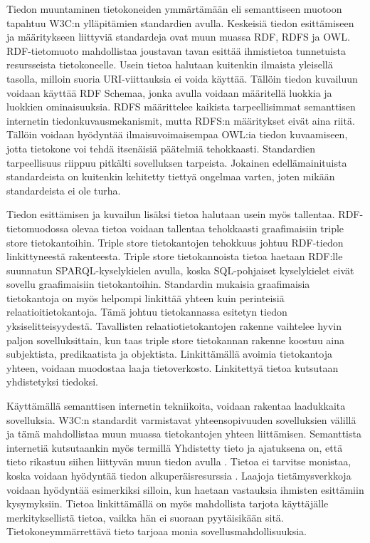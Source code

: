 \documentclass[finnish, 12pt, a4paper, elec, utf8, pdfa, online]{aaltothesis}
\begin{document}
{Tiedon muuntaminen tietokoneiden ymmärtämään eli semanttiseen muotoon tapahtuu W3C:n ylläpitämien standardien avulla. Keskeisiä tiedon esittämiseen ja määritykseen liittyviä standardeja ovat muun muassa RDF, RDFS ja OWL. RDF-tietomuoto mahdollistaa joustavan tavan esittää ihmistietoa tunnetuista resursseista tietokoneelle. Usein tietoa halutaan kuitenkin ilmaista yleisellä tasolla, milloin suoria URI-viittauksia ei voida käyttää. Tällöin tiedon kuvailuun voidaan käyttää RDF Schemaa, jonka avulla voidaan määritellä luokkia ja luokkien ominaisuuksia. RDFS määrittelee kaikista tarpeellisimmat semanttisen internetin tiedonkuvausmekanismit, mutta RDFS:n määritykset eivät aina riitä. Tällöin voidaan hyödyntää ilmaisuvoimaisempaa OWL:ia tiedon kuvaamiseen, jotta tietokone voi tehdä itsenäisiä päätelmiä tehokkaasti. Standardien tarpeellisuus riippuu pitkälti sovelluksen tarpeista. Jokainen edellämainituista standardeista on kuitenkin kehitetty tiettyä ongelmaa varten, joten mikään standardeista ei ole turha.

Tiedon esittämisen ja kuvailun lisäksi tietoa halutaan usein myös tallentaa. RDF-tietomuodossa olevaa tietoa voidaan tallentaa tehokkaasti graafimaisiin triple store tietokantoihin. Triple store tietokantojen tehokkuus johtuu RDF-tiedon linkittyneestä rakenteesta. Triple store tietokannoista tietoa haetaan RDF:lle suunnatun SPARQL-kyselykielen avulla, koska SQL-pohjaiset kyselykielet eivät sovellu graafimaisiin tietokantoihin. Standardin mukaisia graafimaisia tietokantoja on myös helpompi linkittää yhteen kuin perinteisiä relaatioitietokantoja. Tämä johtuu tietokannassa esitetyn tiedon yksiselitteisyydestä. Tavallisten relaatiotietokantojen rakenne vaihtelee hyvin paljon sovelluksittain, kun taas triple store tietokannan rakenne koostuu aina subjektista, predikaatista ja objektista. Linkittämällä avoimia tietokantoja yhteen, voidaan muodostaa laaja tietoverkosto. Linkitettyä tietoa kutsutaan yhdistetyksi tiedoksi.

Käyttämällä semanttisen internetin tekniikoita, voidaan rakentaa laadukkaita sovelluksia. W3C:n standardit varmistavat yhteensopivuuden sovelluksien välillä ja tämä mahdollistaa muun muassa tietokantojen yhteen liittämisen. Semanttista internetiä kutsutaankin myös termillä Yhdistetty tieto ja ajatuksena on, että tieto rikastuu siihen liittyvän muun tiedon avulla \cite{linked_data_finlad}. Tietoa ei tarvitse monistaa, koska voidaan hyödyntää tiedon alkuperäisresurssia \cite{linked_data_finlad}. Laajoja tietämysverkkoja voidaan hyödyntää esimerkiksi silloin, kun haetaan vastauksia ihmisten esittämiin kysymyksiin. Tietoa linkittämällä on myös mahdollista tarjota käyttäjälle merkityksellistä tietoa, vaikka hän ei suoraan pyytäisikään sitä. Tietokoneymmärrettävä tieto tarjoaa monia sovellusmahdollisuuksia.







}
\end{document}
